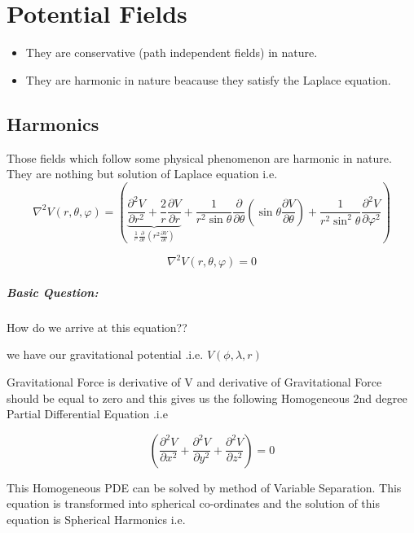 \documentclass[a4paper,12pt]{report}
\begin{document}
\chapter{Potential Fields}
\begin{itemize}
\item They are conservative (path independent fields) in nature.     
\item They are harmonic in nature beacause they satisfy the Laplace equation.
\end{itemize}
\section{Harmonics} Those fields which follow some physical phenomenon are harmonic in nature. They are nothing but solution of Laplace equation i.e.
\begin {equation}
\nabla ^2V(r,\theta ,\varphi) = \left( {\underbrace {\frac{\partial ^2V }{\partial r^2} +
\frac{2}{r}\frac{\partial V }{\partial
r}}_{\frac{1}{^{r^2}}\frac{\partial }{\partial r}\left( {r^2\frac{\partial
V }{\partial r}} \right)} + \frac{1}{r^2\sin \theta }\frac{\partial
}{\partial \theta }\left( {\sin \theta \frac{\partial V }{\partial \theta
}} \right) + \frac{1}{r^2\sin ^2\theta }\frac{\partial ^2V }{\partial
\varphi ^2}} \right)
\end{equation}

\begin {equation}
\nabla ^2V(r,\theta ,\varphi) = 0
\end{equation}

\paragraph{Basic Question:} How do we arrive at this equation??

we have our gravitational potential .i.e. $V(\phi,\lambda,r)$

Gravitational Force is derivative of V and derivative of Gravitational Force should be equal to zero and this gives us the following Homogeneous 2nd degree Partial Differential Equation .i.e

   \[ \left( \frac{\partial^2 V}{\partial x^2}
      + \frac{\partial^2 V}{\partial y^2}
      + \frac{\partial^2 V}{\partial z^2} \right)=0 \]

This Homogeneous PDE  can be solved by method of Variable Separation. This equation is transformed into spherical co-ordinates and the solution of this equation is Spherical Harmonics i.e.
\end{document}
